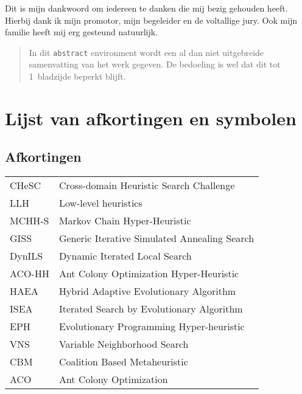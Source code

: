 \documentclass[master=elt,masteroption=ge]{kulemt}
\begin{document}
\begin{preface}
  Dit is mijn dankwoord om iedereen te danken die mij bezig gehouden heeft.
  Hierbij dank ik mijn promotor, mijn begeleider en de voltallige jury.
  Ook mijn familie heeft mij erg gesteund natuurlijk.
\end{preface}

\tableofcontents*

\begin{abstract}
  In dit \texttt{abstract} environment wordt een al dan niet uitgebreide
  samenvatting van het werk gegeven. De bedoeling is wel dat dit tot
  1~bladzijde beperkt blijft.

  \lipsum[1]
\end{abstract}

\listoffiguresandtables
\chapter{Lijst van afkortingen en symbolen}
\section*{Afkortingen}
\begin{flushleft}
  \renewcommand{\arraystretch}{1.1}
  \begin{tabularx}{\textwidth}{@{}p{22mm}X@{}}%
    CHeSC	& Cross-domain Heuristic Search Challenge \\
    LLH		&Low-level heuristics \\
    MCHH-S	&Markov Chain Hyper-Heuristic\\
    GISS	&Generic Iterative Simulated Annealing Search\\
    DynILS	&Dynamic Iterated Local Search\\
    ACO-HH	&Ant Colony Optimization Hyper-Heuristic\\
    HAEA	&Hybrid Adaptive Evolutionary Algorithm\\
    ISEA	&Iterated Search by Evolutionary Algorithm\\
    EPH		&Evolutionary Programming Hyper-heuristic\\
    VNS		&Variable Neighborhood Search\\
    CBM		&Coalition Based Metaheuristic\\
    ACO		&Ant Colony Optimization
  \end{tabularx}
\end{flushleft}
\end{document}
